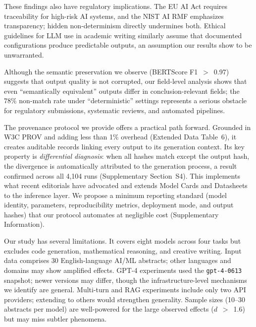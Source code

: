 \documentclass[sn-nature]{sn-jnl}
\begin{document}
These findings also have regulatory implications.
The EU AI Act\cite{euaiact2024} requires traceability for high-risk AI systems, and the NIST AI RMF\cite{nist2023ai} emphasizes transparency; hidden non-determinism directly undermines both.
Ethical guidelines for LLM use in academic writing\cite{porsdam2024ethics} similarly assume that documented configurations produce predictable outputs, an assumption our results show to be unwarranted.

Although the semantic preservation we observe (BERTScore F1~$>$~0.97) suggests that output quality is not corrupted, our field-level analysis shows that even ``semantically equivalent'' outputs differ in conclusion-relevant fields; the 78\% non-match rate under ``deterministic'' settings represents a serious obstacle for regulatory submissions, systematic reviews, and automated pipelines.

The provenance protocol we provide offers a practical path forward.
Grounded in W3C PROV\cite{w3cprov2013} and adding less than 1\% overhead (Extended Data Table~6), it creates auditable records linking every output to its generation context.
Its key property is \emph{differential diagnosis}: when all hashes match except the output hash, the divergence is automatically attributed to the generation process, a result confirmed across all 4,104 runs (Supplementary Section~S4).
This implements what recent editorials have advocated\cite{editorial2024framework} and extends Model Cards\cite{mitchell2019model} and Datasheets\cite{gebru2021datasheets} to the inference layer.
We propose a minimum reporting standard (model identity, parameters, reproducibility metrics, deployment mode, and output hashes) that our protocol automates at negligible cost (Supplementary Information).

Our study has several limitations.
It covers eight models across four tasks but excludes code generation, mathematical reasoning, and creative writing.
Input data comprises 30 English-language AI/ML abstracts; other languages and domains may show amplified effects.
GPT-4 experiments used the \texttt{gpt-4-0613} snapshot; newer versions may differ, though the infrastructure-level mechanisms we identify are general.
Multi-turn and RAG experiments include only two API providers; extending to others would strengthen generality.
Sample sizes (10--30 abstracts per model) are well-powered for the large observed effects ($d$~$>$~1.6) but may miss subtler phenomena.
\end{document}
